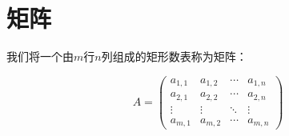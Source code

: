 \documentclass[UTF8]{ctexart}
\begin{document}
\newpage

\section{矩阵}
    我们将一个由$m$行$n$列组成的矩形数表称为矩阵：\\
    \begin{large}
    \begin{equation*}
        A=
        \begin{pmatrix}
            a_{1,1}&a_{1,2}&\cdots&a_{1,n}\\
            a_{2,1}&a_{2,2}&\cdots&a_{2,n}\\
            \vdots&\vdots&\ddots&\vdots\\
            a_{m,1}&a_{m,2}&\cdots&a_{m,n}
        \end{pmatrix}
    \end{equation*}
    \end{large}
\end{document}
